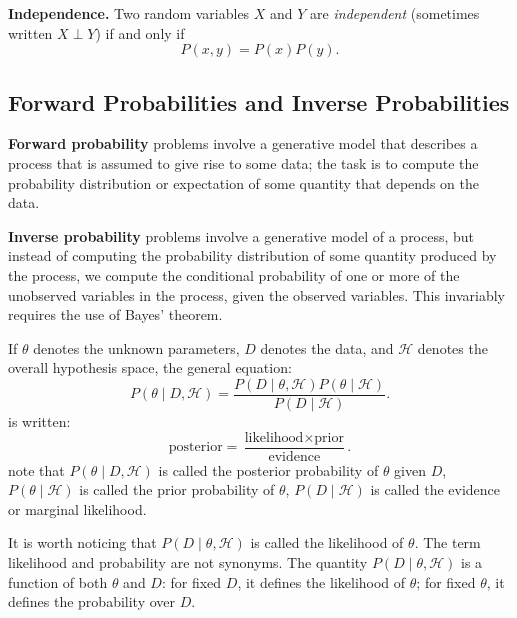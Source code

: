 \documentclass[11pt]{article}
\begin{document}
\par\medskip
\noindent \textbf{Independence.} Two random variables $X$ and $Y$ are \emph{independent} (sometimes written $X\perp Y$) if and only if
\begin{equation*}
  P(x,y) = P(x)P(y).
\end{equation*}

\subsection{Forward Probabilities and Inverse Probabilities}

\textbf{Forward probability} problems involve a generative model that describes a process that is assumed to give rise to some data; the task is to compute the probability distribution or expectation of some quantity that depends on the data. 

\noindent \textbf{Inverse probability} problems involve a generative model of a process, but instead of computing the probability distribution of some quantity produced by the process, we compute the conditional probability of one or more of the unobserved variables in the process, given the observed variables. This invariably requires the use of Bayes' theorem.

\par\medskip
If $\theta$ denotes the unknown parameters, $D$ denotes the data, and $\mathcal{H}$ denotes the overall hypothesis space, the general equation:
\begin{equation*}
  P(\theta \mid D,\mathcal{H}) = \frac{P(D\mid \theta,\mathcal{H})P(\theta\mid \mathcal{H})}{P(D\mid \mathcal{H})}.
\end{equation*}
is written:
\begin{equation*}
  \text{posterior} = \frac{\text{likelihood}\times \text{prior}}{\text{evidence}}.
\end{equation*}
\noindent note that $P(\theta \mid D,\mathcal{H})$ is called the posterior probability of $\theta$ given $D$, $P(\theta\mid \mathcal{H})$ is called the prior probability of $\theta$, $P(D\mid \mathcal{H})$ is called the evidence or marginal likelihood. 

It is worth noticing that $P(D\mid \theta,\mathcal{H})$ is called the likelihood of $\theta$. The term likelihood and probability are not synonyms. The quantity $P(D\mid \theta,\mathcal{H})$ is a function of both $\theta$ and $D$: for fixed $D$, it defines the likelihood of $\theta$; for fixed $\theta$, it defines the probability over $D$.
\end{document}
